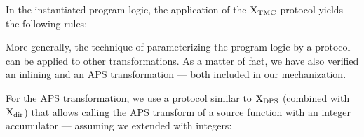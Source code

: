In the instantiated program logic, the application of the $\mathrm{X}_\mathrm{TMC}$ protocol yields the following rules:

More generally, the technique of parameterizing the program logic by a protocol can be applied to other transformations.
As a matter of fact, we have also verified an inlining and an APS transformation --- both included in our mechanization.

For the APS transformation, we use a protocol similar to $\mathrm{X}_\mathrm{DPS}$ (combined with $\mathrm{X}_\mathrm{dir}$) that allows calling the APS transform of a source function with an integer accumulator --- assuming we extended \DataLang with integers:

